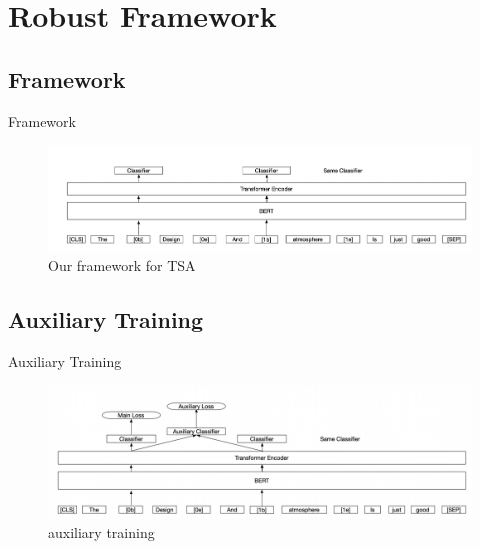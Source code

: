 \documentclass[xcolor=dvipsnames]{beamer}
\begin{document}
\section{Robust Framework}
\subsection{Framework}

\begin{frame}{Framework}
\begin{figure}[h]
  \centering
  \includegraphics[width=\linewidth]{./image/Framework.png}
  \caption{Our framework for TSA}
\label{Framework}
\end{figure}
\end{frame}

\subsection{Auxiliary Training}
\begin{frame}{Auxiliary Training}
\begin{figure}[h]
  \centering
  \includegraphics[width=\linewidth]{./image/aux.png}
  \caption{auxiliary training}
\label{Framework}
\end{figure}
\end{frame}
\end{document}
